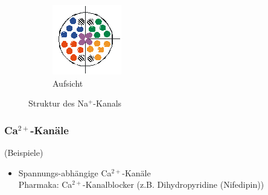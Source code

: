 \documentclass[10pt,a4paper]{report}
\begin{document}
\begin{figure}
\begin{subfigure}[b]{0.1\textwidth}
        \includegraphics[width=\textwidth]{Bilder/kanalaufbau1.png}
        \caption{Aufsicht}
        \label{fig:aufsicht}
    \end{subfigure}
    \caption{Struktur des Na$^+$-Kanals}
    \label{fig:struktur_na_kanal}
\end{figure}

\subsubsection{Ca$^{2+}$-Kanäle} 
(Beispiele)

\begin{itemize}
	\item Spannungs-abhängige Ca$^{2+}$-Kanäle \\
	Pharmaka: Ca$^{2+}$-Kanalblocker (z.B. Dihydropyridine (Nifedipin))
\end{itemize}
\end{document}
